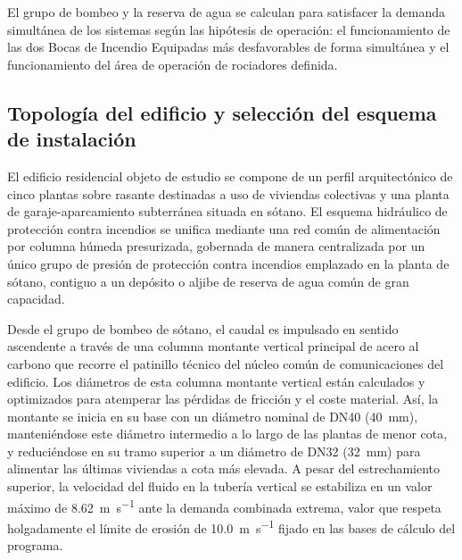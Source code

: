 \documentclass[12pt,a4paper]{article}
\begin{document}
El grupo de bombeo y la reserva de agua se calculan para satisfacer la demanda simultánea de los sistemas según las hipótesis de operación: el funcionamiento de las dos Bocas de Incendio Equipadas más desfavorables de forma simultánea y el funcionamiento del área de operación de rociadores definida.

\subsection{Topología del edificio y selección del esquema de instalación}

El edificio residencial objeto de estudio se compone de un perfil arquitectónico de cinco plantas sobre rasante destinadas a uso de viviendas colectivas y una planta de garaje-aparcamiento subterránea situada en sótano. El esquema hidráulico de protección contra incendios se unifica mediante una red común de alimentación por columna húmeda presurizada, gobernada de manera centralizada por un único grupo de presión de protección contra incendios emplazado en la planta de sótano, contiguo a un depósito o aljibe de reserva de agua común de gran capacidad.

Desde el grupo de bombeo de sótano, el caudal es impulsado en sentido ascendente a través de una columna montante vertical principal de acero al carbono que recorre el patinillo técnico del núcleo común de comunicaciones del edificio. Los diámetros de esta columna montante vertical están calculados y optimizados para atemperar las pérdidas de fricción y el coste material. Así, la montante se inicia en su base con un diámetro nominal de DN40 (\SI{40}{\milli\meter}), manteniéndose este diámetro intermedio a lo largo de las plantas de menor cota, y reduciéndose en su tramo superior a un diámetro de DN32 (\SI{32}{\milli\meter}) para alimentar las últimas viviendas a cota más elevada. A pesar del estrechamiento superior, la velocidad del fluido en la tubería vertical se estabiliza en un valor máximo de \SI{8.62}{\meter\per\second} ante la demanda combinada extrema, valor que respeta holgadamente el límite de erosión de \SI{10.0}{\meter\per\second} fijado en las bases de cálculo del programa.
\end{document}
